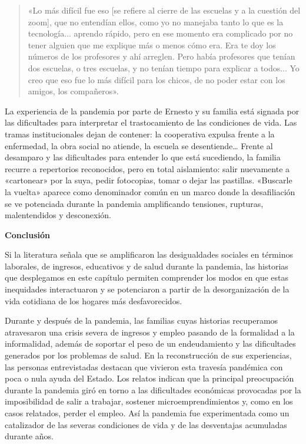 \begin{quote}
«Lo más difícil fue eso {[}se refiere al cierre de las escuelas y a la cuestión del zoom{]}, que no entendían ellos, como yo no manejaba tanto lo que es la tecnología... aprendo rápido, pero en ese momento era complicado por no tener alguien que me explique más o menos cómo era. Era te doy los números de los profesores y ahí arreglen. Pero había profesores que tenían dos escuelas, o tres escuelas, y no tenían tiempo para explicar a todos... Yo creo que eso fue lo más difícil para los chicos, de no poder estar con los amigos, los compañeros».
\end{quote}

La experiencia de la pandemia por parte de Ernesto y su familia está signada por las dificultades para interpretar el trastocamiento de las condiciones de vida. Las tramas institucionales dejan de contener: la cooperativa expulsa frente a la enfermedad, la obra social no atiende, la escuela se desentiende\ldots{} Frente al desamparo y las dificultades para entender lo que está sucediendo, la familia recurre a repertorios reconocidos, pero en total aislamiento: salir nuevamente a «cartonear» por la suya, pedir fotocopias, tomar o dejar las pastillas. «Buscarle la vuelta» aparece como denominador común en un marco donde la desafiliación se ve potenciada durante la pandemia amplificando tensiones, rupturas, malentendidos y desconexión.

\textbf{Conclusión}

Si la literatura señala que se amplificaron las desigualdades sociales en términos laborales, de ingresos, educativos y de salud durante la pandemia, las historias que desplegamos en este capítulo permiten comprender los modos en que estas inequidades interactuaron y se potenciaron a partir de la desorganización de la vida cotidiana de los hogares más desfavorecidos.

Durante y después de la pandemia, las familias cuyas historias recuperamos atravesaron una crisis severa de ingresos y empleo pasando de la formalidad a la informalidad, además de soportar el peso de un endeudamiento y las dificultades generados por los problemas de salud. En la reconstrucción de sus experiencias, las personas entrevistadas destacan que vivieron esta travesía pandémica con poca o nula ayuda del Estado. Los relatos indican que la principal preocupación durante la pandemia giró en torno a las dificultades económicas provocadas por la imposibilidad de salir a trabajar, sostener microemprendimientos y, como en los casos relatados, perder el empleo. Así la pandemia fue experimentada como un catalizador de las severas condiciones de vida y de las desventajas acumuladas durante años.

